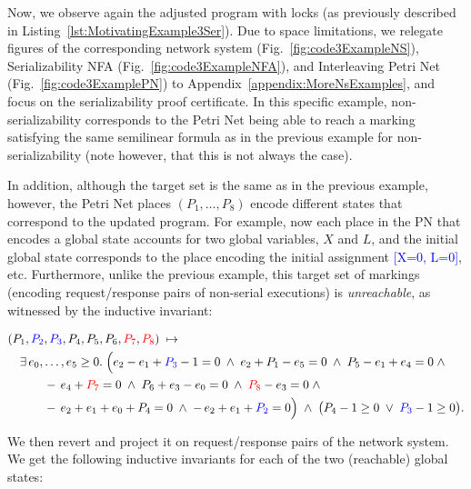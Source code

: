 Now, we observe again the adjusted program with locks (as previously described in Listing~\ref{lst:MotivatingExample3Ser}).
%
Due to space limitations, we relegate figures of the corresponding network system (Fig.~\ref{fig:code3ExampleNS}), Serializability NFA (Fig.~\ref{fig:code3ExampleNFA}), and Interleaving Petri Net (Fig.~\ref{fig:code3ExamplePN}) to Appendix~\ref{appendix:MoreNsExamples}, and focus on the serializability proof certificate.
%
In this specific example, non-serializability corresponds to the Petri Net being able to reach a marking satisfying the same semilinear formula as in the previous example for non-serializability (note however, that this is not always the case). 
%


In addition, although the target set is the same as in the previous example, however, the Petri Net places $(P_1,\ldots,P_8)$ encode different states that correspond to the updated program. For example, now each place in the PN that encodes a global state accounts for two global variables, $X$ and $L$, and the initial global state corresponds to the place encoding the initial assignment \textcolor{blue}{[X=0, L=0]}, etc.
%
Furthermore, unlike the previous example, this target set of markings (encoding request/response pairs of non-serial executions) is \textit{unreachable}, as witnessed by the inductive invariant:


\[
\begin{aligned}
	&(P_{1},\textcolor{blue}{P_{2}},\textcolor{blue}{P_{3}},P_{4},P_{5},P_{6},\textcolor{red}{P_{7}},\textcolor{red}{P_{8}})
	\;\mapsto\;\\
	&\quad
	\exists\,e_{0},\dots,e_{5}\ge0.\;
	\Bigl(
	e_{2}-e_{1}+\textcolor{blue}{P_{3}}-1=0\;\land\;
	e_{2}+P_{1}-e_{5}=0\;\land\;
	P_{5}-e_{1}+e_{4}=0\;\land\\
	&\qquad\quad
	-\,e_{4}+\textcolor{red}{P_{7}}=0\;\land\;
	P_{6}+e_{3}-e_{0}=0\;\land\;
	\textcolor{red}{P_{8}}-e_{3}=0\;\land\\
	&\qquad\quad
	-\,e_{2}+e_{1}+e_{0}+P_{4}=0\;\land\;
	-\,e_{2}+e_{1}+\textcolor{blue}{P_{2}}=0
	\Bigr)
	\;\land\;
	\bigl(P_{4}-1\ge0\;\lor\;\textcolor{blue}{P_{3}}-1\ge0\bigr).
\end{aligned}
\]


We then revert and project it on request/response pairs of the network system.
%
We get the following inductive invariants for each of the two (reachable) global states:


